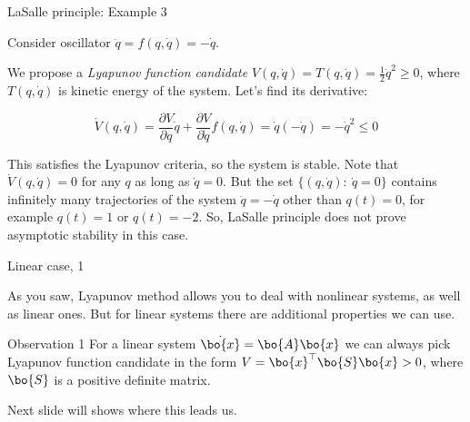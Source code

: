 \documentclass{beamer}
\begin{document}
\begin{frame}{LaSalle principle: Example 3}
	\begin{flushleft}
		
		Consider oscillator $\ddot{q} = f(q, \dot{q}) = -\dot{q}$. 
		
		\bigskip
		
		We propose a \emph{Lyapunov function candidate} $V(q, \dot{q}) = T(q, \dot{q}) = \frac{1}{2} \dot{q}^2 \geq 0$, where $T(q, \dot{q})$ is kinetic energy of the system. Let's find its derivative:
		
		\begin{equation}
			\dot V(q, \dot{q}) = 
			\frac{\partial V}{\partial q}       \dot{q} +
			\frac{\partial V}{\partial \dot{q}} f(q, \dot{q}) = 
			\dot{q} (-\dot{q}) = -\dot{q}^2 \leq 0
		\end{equation}
		
		
		This satisfies the Lyapunov criteria, so the system is stable. Note that $\dot V(q, \dot{q}) = 0$ for any $q$ as long as $\dot{q} = 0$. But the set $\{(q, \dot{q}): \   \dot{q} = 0 \}$ contains infinitely many trajectories of the system $\ddot{q} = -\dot{q}$ other than $q(t) = 0$, for example $q(t) = 1$ or $q(t) = -2$. So, LaSalle principle does not prove asymptotic stability in this case.
		
	\end{flushleft}
\end{frame}






\begin{frame}{Linear case, 1}
\begin{flushleft}

As you saw, Lyapunov method allows you to deal with nonlinear systems, as well as linear ones. But for linear systems there are additional properties we can use.

\bigskip

\begin{block}{Observation 1}
For a linear system $\dot{\bo{x}} = \bo{A}\bo{x}$ we can always pick Lyapunov function candidate in the form $V = \bo{x}^\top\bo{S}\bo{x} > 0$, where $\bo{S}$ is a positive definite matrix.
\end{block}

\bigskip

Next slide will shows where this leads us.

\end{flushleft}
\end{frame}
\end{document}

